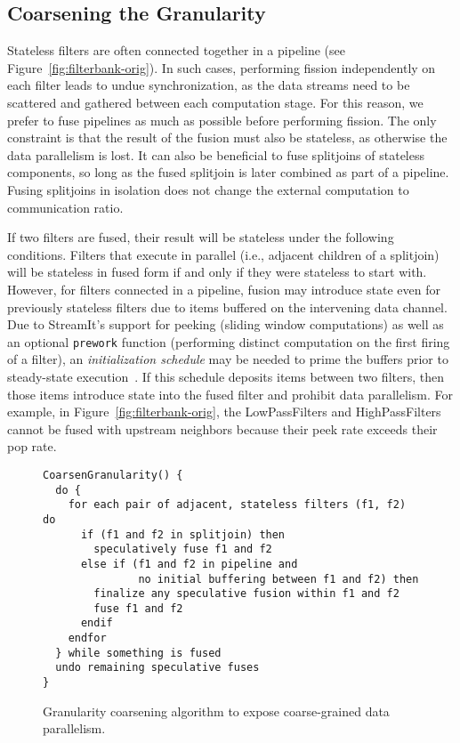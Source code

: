 \subsection{Coarsening the Granularity}

Stateless filters are often connected together in a pipeline (see
Figure~\ref{fig:filterbank-orig}).  In such cases, performing fission
independently on each filter leads to undue synchronization, as the
data streams need to be scattered and gathered between each
computation stage.  For this reason, we prefer to fuse pipelines as
much as possible before performing fission.  The only constraint is
that the result of the fusion must also be stateless, as otherwise the
data parallelism is lost.  It can also be beneficial to fuse
splitjoins of stateless components, so long as the fused splitjoin is
later combined as part of a pipeline.  Fusing splitjoins in isolation
does not change the external computation to communication ratio.

If two filters are fused, their result will be stateless under the
following conditions.  Filters that execute in parallel (i.e.,
adjacent children of a splitjoin) will be stateless in fused form if
and only if they were stateless to start with.  However, for filters
connected in a pipeline, fusion may introduce state even for
previously stateless filters due to items buffered on the intervening
data channel.  Due to StreamIt's support for peeking (sliding window
computations) as well as an optional {\tt prework} function
(performing distinct computation on the first firing of a filter), an
{\it initialization schedule} may be needed to prime the buffers prior
to steady-state execution~\cite{karczma02thesis}.  If this schedule
deposits items between two filters, then those items introduce state
into the fused filter and prohibit data parallelism.  For example, in
Figure~\ref{fig:filterbank-orig}, the LowPassFilters and
HighPassFilters cannot be fused with upstream neighbors because their
peek rate exceeds their pop rate.

\begin{figure}[t]
\small
\begin{verbatim}
CoarsenGranularity() {
  do { 
    for each pair of adjacent, stateless filters (f1, f2) do
      if (f1 and f2 in splitjoin) then
        speculatively fuse f1 and f2
      else if (f1 and f2 in pipeline and
               no initial buffering between f1 and f2) then
        finalize any speculative fusion within f1 and f2
        fuse f1 and f2
      endif
    endfor
  } while something is fused
  undo remaining speculative fuses
}
\end{verbatim}
\caption{Granularity coarsening algorithm to expose coarse-grained
data parallelism.\label{fig:coarsening-code}}
\end{figure}

